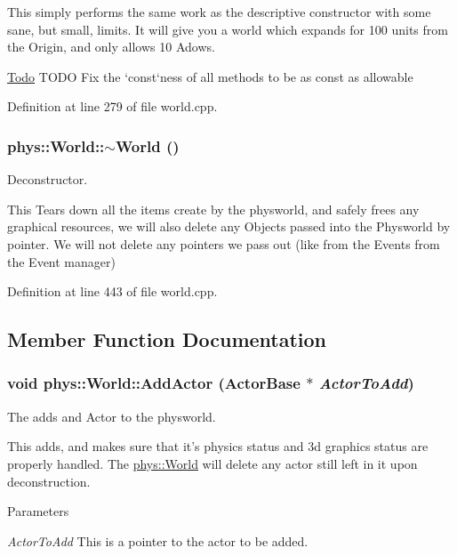This simply performs the same work as the descriptive constructor with some sane, but small, limits. It will give you a world which expands for 100 units from the Origin, and only allows 10 Adows.

\begin{Desc}
\item[\hyperlink{todo__todo000015}{Todo}]TODO Fix the `const`ness of all methods to be as const as allowable \end{Desc}


Definition at line 279 of file world.cpp.

\hypertarget{classphys_1_1World_a8b2c74c7e5d5ce3c46a814e183a7aff1}{
\subsubsection[{$\sim$World}]{\setlength{\rightskip}{0pt plus 5cm}phys::World::$\sim$World ()}}
\label{da/ddf/classphys_1_1World_a8b2c74c7e5d5ce3c46a814e183a7aff1}


Deconstructor. 

This Tears down all the items create by the physworld, and safely frees any graphical resources, we will also delete any Objects passed into the Physworld by pointer. We will not delete any pointers we pass out (like from the Events from the Event manager) 

Definition at line 443 of file world.cpp.



\subsection{Member Function Documentation}
\hypertarget{classphys_1_1World_a0fec41ef68b7bb1443aab927f8277a81}{
\subsubsection[{AddActor}]{\setlength{\rightskip}{0pt plus 5cm}void phys::World::AddActor ({\bf ActorBase} $\ast$ {\em ActorToAdd})}}
\label{da/ddf/classphys_1_1World_a0fec41ef68b7bb1443aab927f8277a81}


The adds and Actor to the physworld. 

This adds, and makes sure that it's physics status and 3d graphics status are properly handled. The \hyperlink{classphys_1_1World}{phys::World} will delete any actor still left in it upon deconstruction. 
\begin{DoxyParams}{Parameters}
\item[{\em ActorToAdd}]This is a pointer to the actor to be added. \end{DoxyParams}


